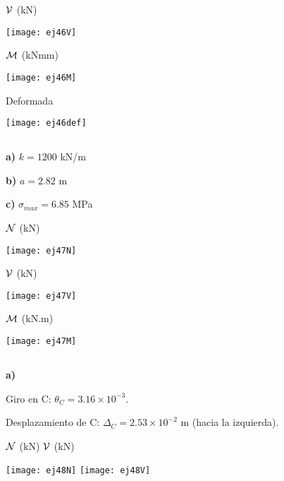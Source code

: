 ${\mathcal V}$ (kN)
\begin{center}
	\texttt{[image: ej46V]}
\end{center}

${\mathcal M}$ (kNmm)

\begin{center}
	\texttt{[image: ej46M]}
\end{center}


Deformada

\begin{center}
	\texttt{[image: ej46def]}
\end{center}


\subsection{}

\textbf{a)} $k = 1200$ kN/m

\textbf{b)} $a = 2.82$ m

\textbf{c)} $\sigma_{max} = 6.85$  MPa

${\mathcal N}$ (kN)

\begin{center}
	\texttt{[image: ej47N]}
\end{center}

${\mathcal V}$ (kN)

\begin{center}
	\texttt{[image: ej47V]}
\end{center}

${\mathcal M}$ (kN.m)

\begin{center}
	\texttt{[image: ej47M]}
\end{center}

\subsection{}
\textbf{a)}

Giro en C: $\theta_C = 3.16 \times 10^{-3}$.

Desplazamiento de C: $\Delta_C = 2.53 \times 10^{-2}$ m (hacia la izquierda).

${\mathcal N}$ (kN) \hspace{0.4\textwidth} ${\mathcal V}$ (kN)
\begin{center}
	\texttt{[image: ej48N]}
	\texttt{[image: ej48V]}
\end{center}

